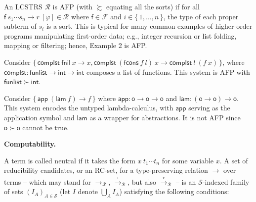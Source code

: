  
An LCSTRS $\mathcal{R}$ is AFP (with $\succsim$ equating all the sorts) if for all ${{\mathsf{f}}\ {{s}_{1}\cdots{s}_{n}}}\rightarrow{r}\ [\varphi]\in\mathcal{R}$ where $\mathsf{f}\in\mathcal{F}$ and $i\in\{\,1,\ldots,n\,\}$, the type of each proper subterm of $s_{i}$ is a sort. This is typical for many common examples of higher-order programs manipulating first-order data; e.g., integer recursion or list folding, mapping or filtering; hence, Example 2 is AFP.\par
 
 
 
Consider $\{\,{{\mathsf{complst}}\ {\mathsf{fnil}}}\ {x}\rightarrow x,{{\mathsf{complst}}\ {({{\mathsf{fcons}}\ {f}}\ {l})}}\ {x}\rightarrow{{\mathsf{complst}}\ {l}}\ {({f}\ {x})}\,\}$, where $\mathsf{complst}:\mathsf{funlist}\rightarrow\mathsf{int}\rightarrow\mathsf{int}$ composes a list of functions. This system is AFP with $\mathsf{funlist}\succ\mathsf{int}$.\par
 
 
 
Consider $\{\,{\mathsf{app}}\ {({\mathsf{lam}}\ {f})}\rightarrow f\,\}$ where $\mathsf{app}:\mathsf{o}\rightarrow\mathsf{o}\rightarrow\mathsf{o}$ and $\mathsf{lam}:(\mathsf{o}\rightarrow\mathsf{o})\rightarrow\mathsf{o}$. This system encodes the untyped lambda-calculus, with $\mathsf{app}$ serving as the application symbol and $\mathsf{lam}$ as a wrapper for abstractions. It is not AFP since $\mathsf{o}\succ\mathsf{o}$ cannot be true.\par
 
 
 
 
 
\par\medskip\noindent\textbf{Computability.}\par
 
 
A term is called neutral if it takes the form ${x}\ {{t}_{1}\cdots{t}_{n}}$ for some variable $x$. A set of reducibility candidates, or an RC-set, for a type-preserving relation $\rightarrow$ over terms – which may stand for $\rightarrow_{\mathcal{R}}$, $\xrightarrow{\scriptscriptstyle\mathrm{i}}_{\mathcal{R}}$, but also $\xrightarrow{\scriptscriptstyle\mathrm{v}}_{\mathcal{R}}$ – is an $\mathcal{S}$-indexed family of sets $(I_{A})_{A\in\mathcal{S}}$ (let $I$ denote $\bigcup_{A}I_{A}$) satisfying the following conditions:\par
  
